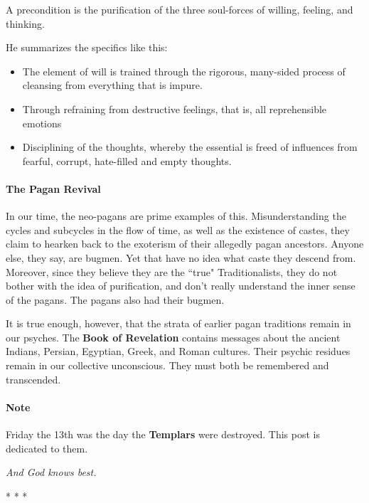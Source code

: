 \begin{quotex}
A precondition is the purification of the three soul-forces of willing, feeling, and thinking. 

\end{quotex}
He summarizes the specifics like this:

\begin{itemize}
\item The element of will is trained through the rigorous, many-sided process of cleansing from everything that is impure. 
\item Through refraining from destructive feelings, that is, all reprehensible emotions 
\item Disciplining of the thoughts, whereby the essential is freed of influences from fearful, corrupt, hate-filled and empty thoughts. 
\end{itemize}
\paragraph{The Pagan Revival}
In our time, the neo-pagans are prime examples of this. Misunderstanding the cycles and subcycles in the flow of time, as well as the existence of castes, they claim to hearken back to the exoterism of their allegedly pagan ancestors. Anyone else, they say, are bugmen. Yet that have no idea what caste they descend from. Moreover, since they believe they are the ``true" Traditionalists, they do not bother with the idea of purification, and don't really understand the inner sense of the pagans. The pagans also had their bugmen.

It is true enough, however, that the strata of earlier pagan traditions remain in our psyches. The \textbf{Book of Revelation} contains messages about the ancient Indians, Persian, Egyptian, Greek, and Roman cultures. Their psychic residues remain in our collective unconscious. They must both be remembered and transcended.

\paragraph{Note}
Friday the 13th was the day the \textbf{Templars }were destroyed. This post is dedicated to them.

\emph{And God knows best.}




\begin{center}* * *\end{center}


